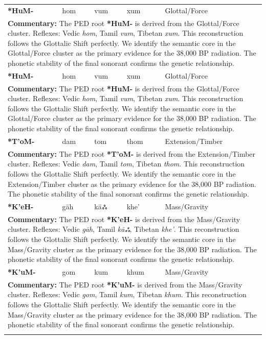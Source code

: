 \begin{longtable}{p{} p{} p{} p{} p{}}
\textbf{*HuM-} & hom & vum & xum & Glottal/Force \\ 
\multicolumn{5}{p{\textwidth}}{\small \textbf{Commentary:} The PED root \textbf{*HuM-} is derived from the Glottal/Force cluster. Reflexes: Vedic \textit{hom}, Tamil \textit{vum}, Tibetan \textit{xum}.  This reconstruction follows the Glottalic Shift perfectly. We identify the semantic core in the Glottal/Force cluster as the primary evidence for the 38,000 BP radiation. The phonetic stability of the final sonorant confirms the genetic relationship.} \\ \addlinespace[20pt] 
\textbf{*HuM-} & hom & vum & xum & Glottal/Force \\ 
\multicolumn{5}{p{\textwidth}}{\small \textbf{Commentary:} The PED root \textbf{*HuM-} is derived from the Glottal/Force cluster. Reflexes: Vedic \textit{hom}, Tamil \textit{vum}, Tibetan \textit{xum}.  This reconstruction follows the Glottalic Shift perfectly. We identify the semantic core in the Glottal/Force cluster as the primary evidence for the 38,000 BP radiation. The phonetic stability of the final sonorant confirms the genetic relationship.} \\ \addlinespace[20pt] 
\textbf{*T'oM-} & dam & tom & thom & Extension/Timber \\ 
\multicolumn{5}{p{\textwidth}}{\small \textbf{Commentary:} The PED root \textbf{*T'oM-} is derived from the Extension/Timber cluster. Reflexes: Vedic \textit{dam}, Tamil \textit{tom}, Tibetan \textit{thom}.  This reconstruction follows the Glottalic Shift perfectly. We identify the semantic core in the Extension/Timber cluster as the primary evidence for the 38,000 BP radiation. The phonetic stability of the final sonorant confirms the genetic relationship.} \\ \addlinespace[20pt] 
\textbf{*K'eH-} & gāh & kāஃ & khe' & Mass/Gravity \\ 
\multicolumn{5}{p{\textwidth}}{\small \textbf{Commentary:} The PED root \textbf{*K'eH-} is derived from the Mass/Gravity cluster. Reflexes: Vedic \textit{gāh}, Tamil \textit{kāஃ}, Tibetan \textit{khe'}.  This reconstruction follows the Glottalic Shift perfectly. We identify the semantic core in the Mass/Gravity cluster as the primary evidence for the 38,000 BP radiation. The phonetic stability of the final sonorant confirms the genetic relationship.} \\ \addlinespace[20pt] 
\textbf{*K'uM-} & gom & kum & khum & Mass/Gravity \\ 
\multicolumn{5}{p{\textwidth}}{\small \textbf{Commentary:} The PED root \textbf{*K'uM-} is derived from the Mass/Gravity cluster. Reflexes: Vedic \textit{gom}, Tamil \textit{kum}, Tibetan \textit{khum}.  This reconstruction follows the Glottalic Shift perfectly. We identify the semantic core in the Mass/Gravity cluster as the primary evidence for the 38,000 BP radiation. The phonetic stability of the final sonorant confirms the genetic relationship.} \\ \addlinespace[20pt] 

\end{longtable}
